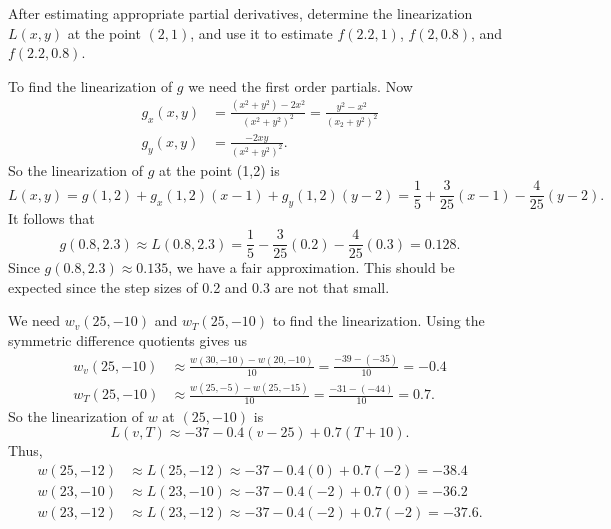 \begin{activity}
  After estimating appropriate partial derivatives, determine the linearization $L(x,y)$ at the point $(2,1)$, and use it to
  estimate $f(2.2, 1)$, $f(2, 0.8)$, and $f(2.2, 0.8)$.



\ea

\end{activity}

\begin{activitySolution}
\ba
\item To find the linearization of $g$ we need the first order partials. Now
\begin{align*}
g_x(x,y) &= \frac{(x^2+y^2)-2x^2}{(x^2+y^2)^2} = \frac{y^2-x^2}{(x_2+y^2)^2} \\
g_y(x,y) &= \frac{-2xy}{(x^2+y^2)^2}.
\end{align*}
So the linearization of $g$ at the point (1,2) is
\[L(x,y) = g(1,2) +g_x(1,2)(x-1) + g_y(1,2)(y-2) = \frac{1}{5} + \frac{3}{25}(x-1) - \frac{4}{25}(y-2).\]
It follows that 
\[g(0.8,2.3) \approx L(0.8,2.3) = \frac{1}{5} - \frac{3}{25}(0.2) - \frac{4}{25}(0.3) = 0.128.\]
Since $g(0.8,2.3) \approx 0.135$, we have a fair approximation. This should be expected since the step sizes of 0.2 and 0.3 are not that small. 
\item We need $w_v(25,-10)$ and $w_T(25,-10)$ to find the linearization. Using the symmetric difference quotients gives us
\begin{align*}
w_v(25,-10) &\approx \frac{w(30,-10)-w(20,-10)}{10} = \frac{-39-(-35)}{10} = -0.4 \\
w_T(25,-10) &\approx \frac{w(25,-5)-w(25,-15)}{10} = \frac{-31-(-44)}{10} = 0.7.
\end{align*}  
So the linearization of $w$ at $(25, -10)$ is 
\[L(v,T) \approx -37 - 0.4(v-25) + 0.7(T+10).\]
Thus,
\begin{align*}
w(25,-12) &\approx L(25,-12) \approx -37 - 0.4(0) + 0.7(-2) = -38.4 \\
w(23, -10) &\approx L(23,-10) \approx -37 - 0.4(-2) + 0.7(0) = -36.2 \\
w(23, -12) &\approx L(23,-12) \approx -37 - 0.4(-2) + 0.7(-2) = -37.6.
\end{align*}


\end{activitySolution}
